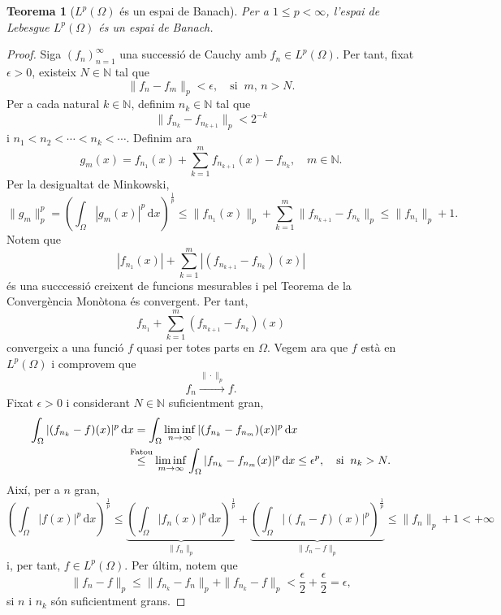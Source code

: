 \documentclass[12pt]{book}
\newtheorem{teorema}{Teorema}[chapter]
\theoremstyle{definition}
\theoremstyle{nota}
\theoremstyle{exemple}
\begin{document}
\begin{teorema}[$L^p(\Omega)$ és un espai de Banach]
  Per a $1 \leq p < \infty$, l'espai de Lebesgue $L^p(\Omega)$ és un
  espai de Banach.
\end{teorema}

\begin{proof}
  Siga $(f_n)_{n=1}^\infty$ una successió de Cauchy amb
  $f_n \in L^p(\Omega)$. Per tant, fixat $\epsilon > 0$, existeix
  $N \in \mathbb{N}$ tal que
  \[
    \|f_n - f_m\|_p < \epsilon, \quad \text{si} \;\; m,\,n > N.
  \]
  Per a cada natural $k \in \mathbb{N}$, definim $n_k \in \mathbb{N}$
  tal que 
  \[
    \|f_{n_k} - f_{n_{k+1}}\|_p < 2^{-k}
  \]
  i $n_1 < n_2 < \dotsb < n_k < \dotsb$. Definim ara
  \[
    g_m(x) = f_{n_1}(x) + \sum_{k=1}^{m} f_{n_{k+1}}(x) - f_{n_k},
    \quad m \in \mathbb{N}.
  \]
  Per la desigualtat de Minkowski,
  \[
    \|g_m\|_p^p = \left( \int_\Omega |g_m(x)|^p\, \mathrm{d}x
    \right)^{\frac{1}{p}} \leq \|f_{n_1}(x)\|_p + \sum_{k=1}^{m}
    \|f_{n_{k+1}} - f_{n_k}\|_p \leq \|f_{n_1}\|_p + 1.
  \]
  Notem que
  \[
    |f_{n_1}(x)| + \sum_{k=1}^{m} |(f_{n_{k+1}} - f_{n_k})(x)| 
  \]
  és una succcessió creixent de funcions mesurables i pel Teorema de
  la Convergència Monòtona és convergent. Per tant,
  \[
    f_{n_1} + \sum_{k=1}^m (f_{n_{k+1}} - f_{n_k})(x)
  \]
  convergeix a una funció $f$ quasi per totes parts en $\Omega$. Vegem
  ara que $f$ està en $L^p(\Omega)$ i comprovem que
  \[
    f_n \xrightarrow{\|\cdot\|_p} f.
  \]
  Fixat $\epsilon > 0$ i considerant $N \in \mathbb{N}$ suficientment
  gran,
  \begin{align*}
    \int_\Omega |(f_{n_k} - f)(x)|^p \, \mathrm{d}x
    &= \int_{\Omega} \liminf_{n\to\infty}
      |(f_{n_k} - f_{n_m})(x)|^p\, \mathrm{d}x \\
    &\overset{\mathclap{\text{Fatou}}}{\leq} \;\;
      \liminf_{m \to \infty} \int_{\Omega}
      |f_{n_k} - f_{n_m}(x)|^p\, \mathrm{d}x \leq \epsilon^p,
      \quad \text{si} \;\; n_k > N.
  \end{align*}
  Així, per a $n$ gran,
  \[
    \left( \int_\Omega |f(x)|^p\, \mathrm{d}x \right)^{\frac{1}{p}}
    \leq \underbrace{\left( \int_\Omega |f_n(x)|^p\, \mathrm{d}x
      \right)^{\frac{1}{p}}}_{\|f_n\|_p} + \underbrace{\left(
        \int_\Omega |(f_n-f)(x)|^p \right)^{\frac{1}{p}}}_{\|f_n -
      f\|_p} \leq \|f_n\|_p + 1 < +\infty
  \]
  i, per tant, $f \in L^p(\Omega)$. Per últim, notem que
  \[
    \|f_n - f\|_p \leq \|f_{n_k} - f_n\|_p + \|f_{n_k} - f\|_p <
    \frac{\epsilon}{2} + \frac{\epsilon}{2} = \epsilon,
  \]
  si $n$ i $n_k$ són suficientment grans.
\end{proof}
\end{document}
